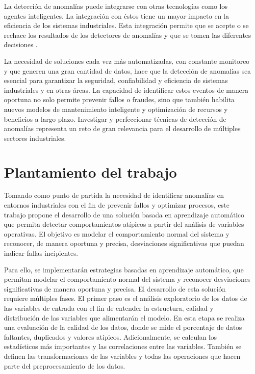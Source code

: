\documentclass[11pt,a4paper,spanish]{book}
\numberwithin{equation}{chapter}
\numberwithin{figure}{chapter}
\begin{document}
La detección de anomalías puede integrarse con otras tecnologías como los agentes 
inteligentes. 
La integración con éstos tiene un mayor impacto en la eficiencia de los sistemas 
industriales. Esta integración permite que se acepte o se rechace los resultados de 
los detectores de anomalías y que se tomen las diferentes decisiones 
\cite{jidiga2014anomaly}.


La necesidad de soluciones cada vez más automatizadas, con constante monitoreo y que 
generen una gran cantidad de datos, hace que la detección de anomalías sea esencial 
para garantizar la seguridad, confiabilidad y eficiencia de sistemas industriales y en 
otras áreas. 
La capacidad de identificar estos eventos de manera oportuna no solo permite prevenir 
fallos o fraudes, sino que también habilita nuevos modelos de mantenimiento inteligente 
y optimización de recursos y beneficios a largo plazo. Investigar y perfeccionar 
técnicas de detección de anomalías representa un reto de gran relevancia para el 
desarrollo de múltiples sectores industriales.


\section{Plantamiento del trabajo}

Tomando como punto de partida la necesidad de identificar anomalías en entornos 
industriales con el fin de prevenir fallos y optimizar procesos, este trabajo propone 
el desarrollo de una solución basada en aprendizaje automático que permita detectar 
comportamientos atípicos a partir del análisis de variables operativas. El objetivo es 
modelar el comportamiento normal del sistema y reconocer, de manera oportuna y precisa, 
desviaciones significativas que puedan indicar fallas incipientes. 


Para ello, se implementarán estrategias basadas en aprendizaje automático, que permitan 
modelar el comportamiento normal del sistema y reconocer desviaciones significativas de 
manera oportuna y precisa. 
El desarrollo de esta solución requiere múltiples fases. 
El primer paso es el análisis exploratorio de los datos de las variables de entrada con 
el fin de entender la estructura,  calidad y distribución de las variables que 
alimentarán el modelo. 
En esta etapa se realiza una evaluación de la calidad de los datos, donde se mide el 
porcentaje de datos faltantes, duplicados y valores atípicos. 
Adicionalmente, se calculan los estadísticos más importantes y las correlaciones entre 
las variables. 
También se definen las transformaciones de las variables y todas las operaciones que 
hacen parte del preprocesamiento de los datos.
\end{document}
